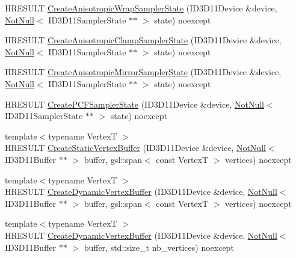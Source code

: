 \begin{DoxyCompactItemize}
\item 
H\+R\+E\+S\+U\+LT \mbox{\hyperlink{namespacemage_1_1rendering_a095bd9e1ca72cd2a27c49f901bb4ea89}{Create\+Anisotropic\+Wrap\+Sampler\+State}} (I\+D3\+D11\+Device \&device, \mbox{\hyperlink{namespacemage_a8769f9d670d6b585ea306cb1062af94b}{Not\+Null}}$<$ I\+D3\+D11\+Sampler\+State $\ast$$\ast$ $>$ state) noexcept
\item 
H\+R\+E\+S\+U\+LT \mbox{\hyperlink{namespacemage_1_1rendering_a84f8d95cd6a9774ff39ee3ec278973ae}{Create\+Anisotropic\+Clamp\+Sampler\+State}} (I\+D3\+D11\+Device \&device, \mbox{\hyperlink{namespacemage_a8769f9d670d6b585ea306cb1062af94b}{Not\+Null}}$<$ I\+D3\+D11\+Sampler\+State $\ast$$\ast$ $>$ state) noexcept
\item 
H\+R\+E\+S\+U\+LT \mbox{\hyperlink{namespacemage_1_1rendering_a408271395f60644294efde7390c1df1e}{Create\+Anisotropic\+Mirror\+Sampler\+State}} (I\+D3\+D11\+Device \&device, \mbox{\hyperlink{namespacemage_a8769f9d670d6b585ea306cb1062af94b}{Not\+Null}}$<$ I\+D3\+D11\+Sampler\+State $\ast$$\ast$ $>$ state) noexcept
\item 
H\+R\+E\+S\+U\+LT \mbox{\hyperlink{namespacemage_1_1rendering_abb78ea9d1e7925cef40e2865cd726b78}{Create\+P\+C\+F\+Sampler\+State}} (I\+D3\+D11\+Device \&device, \mbox{\hyperlink{namespacemage_a8769f9d670d6b585ea306cb1062af94b}{Not\+Null}}$<$ I\+D3\+D11\+Sampler\+State $\ast$$\ast$ $>$ state) noexcept
\item 
{\footnotesize template$<$typename VertexT $>$ }\\H\+R\+E\+S\+U\+LT \mbox{\hyperlink{namespacemage_1_1rendering_af9ed5791a6fbd9fc54870625efb66943}{Create\+Static\+Vertex\+Buffer}} (I\+D3\+D11\+Device \&device, \mbox{\hyperlink{namespacemage_a8769f9d670d6b585ea306cb1062af94b}{Not\+Null}}$<$ I\+D3\+D11\+Buffer $\ast$$\ast$ $>$ buffer, gsl\+::span$<$ const VertexT $>$ vertices) noexcept
\item 
{\footnotesize template$<$typename VertexT $>$ }\\H\+R\+E\+S\+U\+LT \mbox{\hyperlink{namespacemage_1_1rendering_af0e636c68cb76d840621730d394231bb}{Create\+Dynamic\+Vertex\+Buffer}} (I\+D3\+D11\+Device \&device, \mbox{\hyperlink{namespacemage_a8769f9d670d6b585ea306cb1062af94b}{Not\+Null}}$<$ I\+D3\+D11\+Buffer $\ast$$\ast$ $>$ buffer, gsl\+::span$<$ const VertexT $>$ vertices) noexcept
\item 
{\footnotesize template$<$typename VertexT $>$ }\\H\+R\+E\+S\+U\+LT \mbox{\hyperlink{namespacemage_1_1rendering_afc80a3bf1005a6d5c6dd102a9cfeb60a}{Create\+Dynamic\+Vertex\+Buffer}} (I\+D3\+D11\+Device \&device, \mbox{\hyperlink{namespacemage_a8769f9d670d6b585ea306cb1062af94b}{Not\+Null}}$<$ I\+D3\+D11\+Buffer $\ast$$\ast$ $>$ buffer, std\+::size\+\_\+t nb\+\_\+vertices) noexcept
$$
\end{DoxyCompactItemize}

